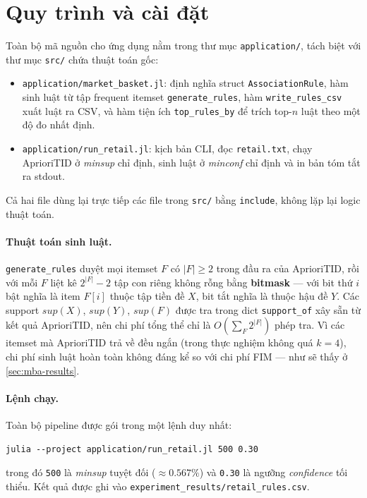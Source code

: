 \section{Quy trình và cài đặt}
\label{sec:mba-pipeline}

Toàn bộ mã nguồn cho ứng dụng nằm trong thư mục \texttt{application/}, tách biệt với thư mục \texttt{src/} chứa thuật toán gốc:

\begin{itemize}
    \item \texttt{application/market\_basket.jl}: định nghĩa struct \texttt{AssociationRule}, hàm sinh luật từ tập frequent itemset \texttt{generate\_rules}, hàm \texttt{write\_rules\_csv} xuất luật ra CSV, và hàm tiện ích \texttt{top\_rules\_by} để trích top-$n$ luật theo một độ đo nhất định.
    \item \texttt{application/run\_retail.jl}: kịch bản CLI, đọc \texttt{retail.txt}, chạy AprioriTID ở \textit{minsup} chỉ định, sinh luật ở \textit{minconf} chỉ định và in bản tóm tắt ra stdout.
\end{itemize}

Cả hai file dùng lại trực tiếp các file trong \texttt{src/} bằng \texttt{include}, không lặp lại logic thuật toán.

\paragraph{Thuật toán sinh luật.} \texttt{generate\_rules} duyệt mọi itemset $F$ có $|F| \ge 2$ trong đầu ra của AprioriTID, rồi với mỗi $F$ liệt kê $2^{|F|} - 2$ tập con riêng không rỗng bằng \textbf{bitmask} --- với bit thứ $i$ bật nghĩa là item $F[i]$ thuộc tập tiền đề $X$, bit tắt nghĩa là thuộc hậu đề $Y$. Các support $\textit{sup}(X)$, $\textit{sup}(Y)$, $\textit{sup}(F)$ được tra trong dict \texttt{support\_of} xây sẵn từ kết quả AprioriTID, nên chi phí tổng thể chỉ là $O\!\left(\sum_{F} 2^{|F|}\right)$ phép tra. Vì các itemset mà AprioriTID trả về đều ngắn (trong thực nghiệm không quá $k=4$), chi phí sinh luật hoàn toàn không đáng kể so với chi phí FIM --- như sẽ thấy ở \autoref{sec:mba-results}.

\paragraph{Lệnh chạy.} Toàn bộ pipeline được gói trong một lệnh duy nhất:
\begin{verbatim}
julia --project application/run_retail.jl 500 0.30
\end{verbatim}
trong đó \texttt{500} là \textit{minsup} tuyệt đối ($\approx 0.567\%$) và \texttt{0.30} là ngưỡng \textit{confidence} tối thiểu. Kết quả được ghi vào \texttt{experiment\_results/retail\_rules.csv}.

